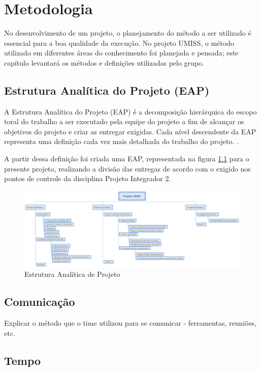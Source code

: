 \chapter{Metodologia}

No desenvolvimento de um projeto, o planejamento do método a ser utilizado
é essencial para a boa qualidade da execução. No projeto UMISS, o método
utilizado em diferentes áreas do conhecimento foi planejada e pensada;
este capítulo levantará os métodos e definições utilizadas pelo grupo.

\section{Estrutura Analítica do Projeto (EAP)}
A Estrutura Analítica do Projeto (EAP) é a decomposição hierárquica do escopo 
toral do trabalho a ser executado pela equipe do projeto a fim de alcançar
os objetivos do projeto e criar as entregar exigidas. Cada nível descendente 
da EAP representa uma definição cada vez mais detalhada do trabalho do 
projeto. \cite{pmbok}.

A partir dessa definição foi criada uma EAP, representada na figura \ref{fig:eap}
para o presente projeto, realizando 
a divisão das entregas de acordo com o exigido nos pontos de controle da 
disciplina Projeto Integrador 2.

\begin{figure}[H]
  \centering
    \includegraphics[width=\textwidth]{figuras/eap.eps}
  \caption{Estrutura Analítica de Projeto}
  \label{fig:eap}
\end{figure}

\section{Comunicação}

Explicar o método que o time utilizou para se comunicar - ferramentas, reuniões, etc.

\section{Tempo}

